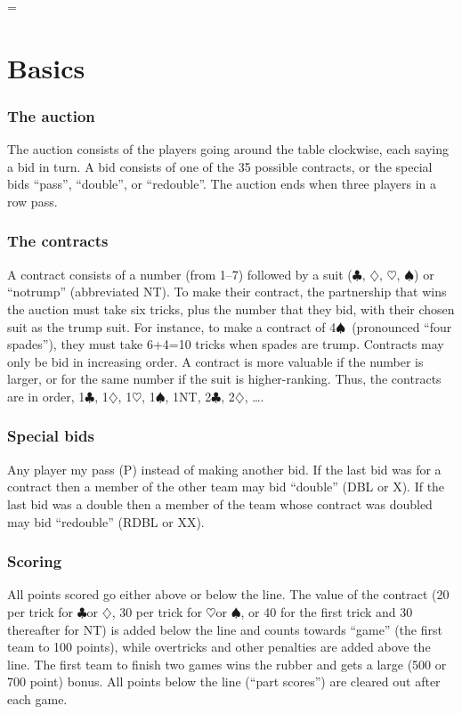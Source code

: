 \documentclass[oneside]{memoir}
\makeatletter
\newif\if@extratext
\newenvironment{extra}{\if@extratext\else\setbox\@throwaway=\vbox\bgroup\fi}%
	       {\if@extratext\else\egroup\fi}
\def\C{$\clubsuit$}
\def\D{$\diamondsuit$}
\def\H{$\heartsuit$}
\def\S{$\spadesuit$}
\makeatother
\begin{document}
\begin{extra}
  \chapter*{Basics}
  \subsection*{The auction}
  The auction consists of the players going around the table clockwise,
  each saying a bid in turn.  A bid consists of one of the 35 possible
  contracts, or the special bids ``pass'', ``double'', or ``redouble''.
  The auction ends when three players in a row pass.
  \subsection*{The contracts}
  A contract consists of a number (from 1--7) followed by a suit (\C, \D,
  \H, \S) or ``notrump'' (abbreviated NT).  To make their contract, the
  partnership that wins the auction must take six tricks, plus the
  number that they bid, with their chosen suit as the trump suit.  For 
  instance, to make a contract of 4\S\ (pronounced ``four spades''),
  they must take 6+4=10 tricks when spades are trump.  Contracts
  may only be bid in increasing order.  A contract is more valuable if
  the number is larger, or for the same number if the suit is higher-ranking.
  Thus, the contracts are in order, 1\C, 1\D, 1\H, 1\S, 1NT, 2\C, 2\D, \ldots.
  \subsection*{Special bids}
  Any player my pass (P) instead of making another bid.  If the last
  bid was for a contract then a member of the other team may bid
  ``double'' (DBL or X).  If the last bid was a double then a member of the
  team whose contract was doubled may bid ``redouble'' (RDBL or XX).
  \subsection*{Scoring}
  All points scored go either above or below the line.  The value of the
  contract (20 per trick for \C or \D, 30 per trick for \H or \S, or 40
  for the first trick and 30 thereafter for NT) is added below the line
  and counts towards ``game'' (the first team to 100 points), while overtricks
  and other penalties are added above the line.  The first team to finish
  two games wins the rubber and gets a large (500 or 700 point) bonus.  All
  points below the line (``part scores'') are cleared out after each game.

\end{extra}
\end{document}
